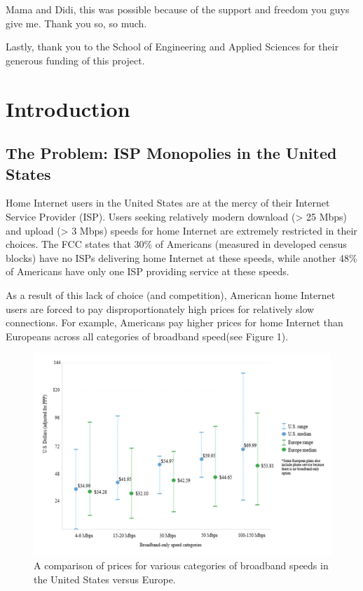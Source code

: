 \documentclass[pageno]{jpaper}
\begin{document}
Mama and Didi, this was possible because of the support and freedom you guys give me. Thank you so, so much.

Lastly, thank you to the School of Engineering and Applied Sciences for their generous funding of this project. 
\pagebreak

\tableofcontents
\listoffigures

\pagebreak
\section{Introduction}
\subsection{The Problem: ISP Monopolies in the United States}
Home Internet users in the United States are at the mercy of their Internet Service Provider (ISP). Users seeking relatively modern download (> 25 Mbps) and upload (> 3 Mbps) speeds for home Internet are extremely restricted in their choices. The FCC states that 30\% of Americans (measured in developed census blocks) have no ISPs delivering home Internet at these speeds, while another 48\% of Americans have only one ISP providing service at these speeds\cite{fcc15}.

As a result of this lack of choice (and competition), American home Internet users are forced to pay disproportionately high prices for relatively slow connections. For example, Americans pay higher prices for home Internet than Europeans across all categories of broadband speed\cite{connectivity}(see Figure 1).

\begin{figure}[h]
	\caption[Comparison of broadband speeds, US vs Europe]{A comparison of prices for various categories of broadband speeds in the United States versus Europe.\cite{connectivity}}
	\centerline{\includegraphics{comparison}}
\end{figure}
\end{document}
